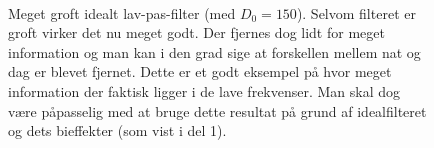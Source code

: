 \documentclass[a4paper, 10pt, danish, final]{article}
\begin{document}
\begin{figure}[!h]
    \centering
    \hspace{1em}
    \\
    \caption[]{Meget groft idealt lav-pas-filter (med $D_0 = 150$).
    Selvom filteret er groft virker det nu meget godt. Der fjernes dog
    lidt for meget information og man kan i den grad sige at forskellen
    mellem nat og dag er blevet fjernet. Dette er et godt eksempel på
    hvor meget information der faktisk ligger i de lave frekvenser. Man
    skal dog være påpasselig med at bruge dette resultat på grund af
    idealfilteret og dets bieffekter (som vist i del 1).}
    \label{temp_low}
\end{figure}
\end{document}
